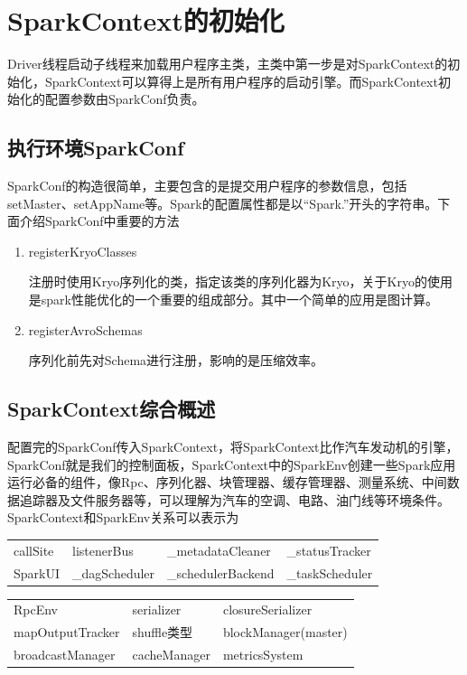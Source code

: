 \chapter{SparkContext的初始化}
\label{scinitial}
Driver线程启动子线程来加载用户程序主类，主类中第一步是对SparkContext的初始化，SparkContext可以算得上是所有用户程序的启动引擎。而SparkContext初始化的配置参数由SparkConf负责。
\section{执行环境SparkConf}
SparkConf的构造很简单，主要包含的是提交用户程序的参数信息，包括setMaster、setAppName等。Spark的配置属性都是以“Spark.”开头的字符串。下面介绍SparkConf中重要的方法
\begin{enumerate}[\bfseries 1]
	\item registerKryoClasses
	
	注册时使用Kryo序列化的类，指定该类的序列化器为Kryo，关于Kryo的使用是spark性能优化的一个重要的组成部分。其中一个简单的应用是图计算。
	\item registerAvroSchemas
	
	序列化前先对Schema进行注册，影响的是压缩效率。
\end{enumerate}
\section{SparkContext综合概述}
配置完的SparkConf传入SparkContext，将SparkContext比作汽车发动机的引擎，SparkConf就是我们的控制面板，SparkContext中的SparkEnv创建一些Spark应用运行必备的组件，像Rpc、序列化器、块管理器、缓存管理器、测量系统、中间数据追踪器及文件服务器等，可以理解为汽车的空调、电路、油门线等环境条件。SparkContext和SparkEnv关系可以表示为
\begin{tcolorbox}[title=SparkContect]
	\begin{tabularx}{\linewidth}{XXXX}
		callSite&listenerBus&\_metadataCleaner&\_statusTracker\\
		SparkUI&\_dagScheduler&\_schedulerBackend&\_taskScheduler\\
	\end{tabularx}
	\begin{tcolorbox}[title=SparkEnv]
		\begin{tabularx}{\linewidth}{XXX}
			RpcEnv&serializer&closureSerializer\\
			mapOutputTracker&shuffle类型&blockManager(master)\\
			broadcastManager&cacheManager&metricsSystem\\
		\end{tabularx}
	\end{tcolorbox}
\end{tcolorbox}
